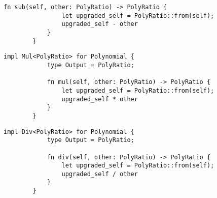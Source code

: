 {\begin{lstlisting}[caption={The implementation of the subtraction operation between \texttt{Polynomial} and \texttt{PolyRatio}}, label={lst:polyratio-polynomial-sub}]
            fn sub(self, other: PolyRatio) -> PolyRatio {
                let upgraded_self = PolyRatio::from(self);
                upgraded_self - other
            }
        }
    \end{lstlisting}

    \begin{lstlisting}[caption={The implementation of the multiplication operation between \texttt{Polynomial} and \texttt{PolyRatio}}, label={lst:polyratio-polynomial-mul}]
        impl Mul<PolyRatio> for Polynomial {
            type Output = PolyRatio;
        
            fn mul(self, other: PolyRatio) -> PolyRatio {
                let upgraded_self = PolyRatio::from(self);
                upgraded_self * other
            }
        }
    \end{lstlisting}

    \begin{lstlisting}[caption={The implementation of the division operation between \texttt{Polynomial} and \texttt{PolyRatio}}, label={lst:polyratio-polynomial-div}]
        impl Div<PolyRatio> for Polynomial {
            type Output = PolyRatio;
        
            fn div(self, other: PolyRatio) -> PolyRatio {
                let upgraded_self = PolyRatio::from(self);
                upgraded_self / other
            }
        }
    \end{lstlisting}
}
